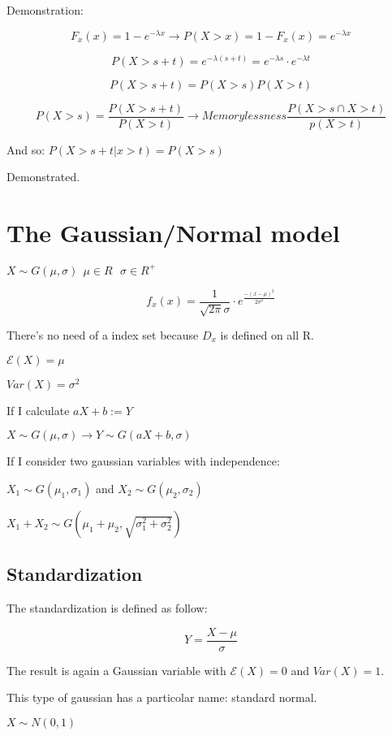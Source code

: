 \documentclass{article}
\begin{document}
Demonstration:

$$F_x(x) = 1 - e^{-\lambda x} \rightarrow P(X > x) = 1 - F_x(x) = e^{- \lambda x}$$

$$P(X > s + t) = e^{- \lambda (s+t)} = e^{-\lambda s} \cdot e^{- \lambda t}$$

$$P(X > s + t ) = P(X > s)P(X > t)$$

$$P(X>s) = \frac{P(X > s +t )}{P(X > t)} \rightarrow Memorylessness \frac{P(X > s \cap X > t)}{p(X > t)}$$

And so: $P(X > s + t | x > t) = P(X>s)$

Demonstrated.

\section{The Gaussian/Normal model}

$X \sim G(\mu,\sigma) \ \ \mu \in R \ \ \ \sigma \in R^+$

$$f_x(x) = \frac{1}{\sqrt{2\pi}\sigma}\cdot e^{\frac{- (x - \mu)^2}{2\sigma^2}}$$

There's no need of a index set because $D_x$ is defined on all R.

\bigskip

$\mathcal E(X) = \mu$

$Var(X) = \sigma^2$

\bigskip

If I calculate $aX +b:= Y$ 

$X \sim G(\mu,\sigma) \rightarrow Y \sim G(aX +b,\sigma)$

\bigskip

If I consider two gaussian variables with independence:

$X_1 \sim G(\mu_1,\sigma_1)$ and $X_2 \sim G(\mu_2,\sigma_2)$

$X_1 + X_2 \sim G(\mu_1+\mu_2,\sqrt{\sigma_1^2 + \sigma_2^2})$

\subsection{Standardization}

The standardization is defined as follow:

$$Y = \frac{X - \mu}{\sigma}$$

The result is again a Gaussian variable with $\mathcal E(X) = 0$ and $Var(X) = 1$.

This type of gaussian has a particolar name: standard normal.

$X \sim N(0,1)$
\end{document}
